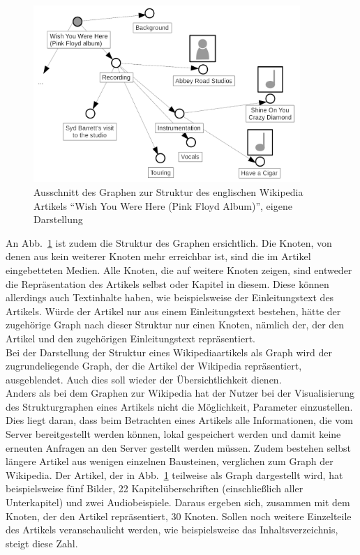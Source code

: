 \documentclass[12pt, a4paper]{article}
\begin{document}
\begin{figure}
\includegraphics[width=0.9\textwidth]{wish_you_were_here.png}
\caption[Ausschnitt des Graphen zur Struktur des englischen Wikipedia Artikels "`Wish You Were Here (Pink Floyd Album)"']{Ausschnitt des Graphen zur Struktur des englischen Wikipedia Artikels "`Wish You Were Here (Pink Floyd Album)"', eigene Darstellung}
\label{wish_you_were_here}
\end{figure}

An Abb.~\ref{wish_you_were_here} ist zudem die Struktur des Graphen ersichtlich.  Die Knoten, von denen aus kein weiterer Knoten mehr erreichbar ist, sind die im Artikel eingebetteten Medien. Alle Knoten, die auf weitere Knoten zeigen, sind entweder die Repräsentation des Artikels selbst oder Kapitel in diesem. Diese können allerdings auch Textinhalte haben, wie beispielsweise der Einleitungstext des Artikels. Würde der Artikel nur aus einem Einleitungstext bestehen, hätte der zugehörige Graph nach dieser Struktur nur einen Knoten, nämlich der, der den Artikel und den zugehörigen Einleitungstext repräsentiert.\\

Bei der Darstellung der Struktur eines Wikipediaartikels als Graph wird der zugrundeliegende Graph, der die Artikel der Wikipedia repräsentiert, ausgeblendet. Auch dies soll wieder der Übersichtlichkeit dienen.\\

Anders als bei dem Graphen zur Wikipedia hat der Nutzer bei der Visualisierung des Strukturgraphen eines Artikels nicht die Möglichkeit, Parameter einzustellen. Dies liegt daran, dass beim Betrachten eines Artikels alle Informationen, die vom Server bereitgestellt werden können, lokal gespeichert werden und damit keine erneuten Anfragen an den Server gestellt werden müssen. Zudem bestehen selbst längere Artikel aus wenigen einzelnen Bausteinen, verglichen zum Graph der Wikipedia. Der Artikel, der in Abb.~\ref{wish_you_were_here} teilweise als Graph dargestellt wird, hat beispielsweise fünf Bilder, 22 Kapitelüberschriften (einschließlich aller Unterkapitel) und zwei Audiobeispiele. Daraus ergeben sich, zusammen mit dem Knoten, der den Artikel repräsentiert, 30 Knoten. Sollen noch weitere Einzelteile des Artikels veranschaulicht werden, wie beispielsweise das Inhaltsverzeichnis, steigt diese Zahl.\\
\end{document}

